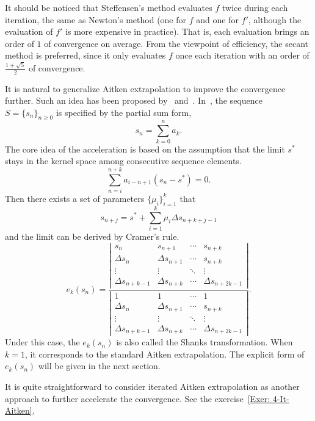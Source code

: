 \begin{remark}
    It should be noticed that Steffensen's method evaluates $f$ twice during each iteration, the same as Newton's method (one for $f$ and one for $f'$, although the evaluation of $f'$ is more expensive in practice). That is, each evaluation brings an order of $1$ of convergence on average. From the viewpoint of efficiency, the secant method is preferred, since it only evaluates $f$ once each iteration with an order of $\frac{1+\sqrt{5}}{2}$ of convergence. 
\end{remark}
It is natural to generalize Aitken extrapolation to improve the convergence further. Such an idea has been proposed by~\cite{schmidt1941xxxii} and~\cite{shanks1955non}. In~\cite{shanks1955non}, the sequence $S = \{s_n\}_{n\ge 0}$ is specified by the partial sum form,
\begin{equation}
    s_n = \sum_{k=0}^n a_k. 
\end{equation}
The core idea of the acceleration is based on the assumption that the limit $s^{\ast}$ stays in the kernel space among consecutive sequence elements. $$ \sum_{n=i}^{n+k} a_{i - n + 1} ( s_n -  s^{\ast} ) = 0.$$ Then there exists a set of parameters $\{ \mu_i \}_{i=1}^k $ that 
\begin{equation}
    s_{n+j} = s^{\ast} + \sum_{i=1}^k \mu_i \Delta s_{n+k+j-1}
\end{equation}
and the limit can be derived by Cramer's rule.
\begin{equation}
    e_k(s_n) = \frac{\left|\begin{matrix}
        s_n & s_{n+1} & \cdots & s_{n+k} \\
        \Delta s_{n} & \Delta s_{n+1} & \cdots & s_{n+k} \\
        \vdots & \vdots & \ddots & \vdots \\
        \Delta s_{n+k-1} & \Delta s_{n+k} & \cdots & \Delta s_{n+2k-1}
    \end{matrix} \right|}{\left|     
    \begin{matrix}
      1 & 1 & \cdots & 1 \\
        \Delta s_{n} & \Delta s_{n+1} & \cdots & s_{n+k} \\
        \vdots & \vdots & \ddots & \vdots \\
        \Delta s_{n+k-1} & \Delta s_{n+k} & \cdots & \Delta s_{n+2k-1}      
    \end{matrix}
\right|}.
\end{equation}
Under this case, the $ e_k(s_n) $ is also called the Shanks transformation. When $k=1$, it corresponds to the standard Aitken extrapolation. The explicit form of $ e_k(s_n) $ will be given in the next section.
\begin{remark}
    It is quite straightforward to consider iterated Aitken extrapolation as another approach to further accelerate the convergence. See the exercise~\ref{Exer: 4-It-Aitken}. 
\end{remark}
